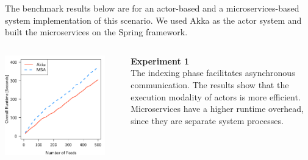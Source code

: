 \documentclass[final,hyperref={pdfpagelabels=true}]{beamer}
\begin{document}
\begin{frame}
\begin{columns}[t]
\begin{column}{.43\textwidth}
{\begin{justify}
        \vspace*{.88\baselineskip}
        
        The benchmark results below are for an actor-based and a
        microservices-based system implementation of this scenario. We used Akka
        as the actor system and built the microservices on the Spring framework.
        \end{justify}
      }

      \renewcommand\sfdefault{lmss} %
      
      \begin{columns}[t]
        \begin{column}{.46\textwidth}
          \begin{center}
          \includegraphics[width=1\textwidth]{graphics/eval-index-overall.pdf}
          \end{center}
        \end{column}
        \begin{column}{.08\textwidth}
        \end{column}
        \begin{column}{.46\textwidth}
          {\lmodern
            \begin{justify}
              \textsf{\textbf{Experiment 1}} \\
              \vspace*{.5\baselineskip}
              The indexing phase facilitates asynchronous communication. The
              results show that the execution modality of actors is more
              efficient. Microservices have a higher runtime overhead, since
              they are separate system processes. 
            \end{justify}
          }
        \end{column}
      \end{columns}


\end{column}
\end{columns}
\end{frame}
\end{document}
